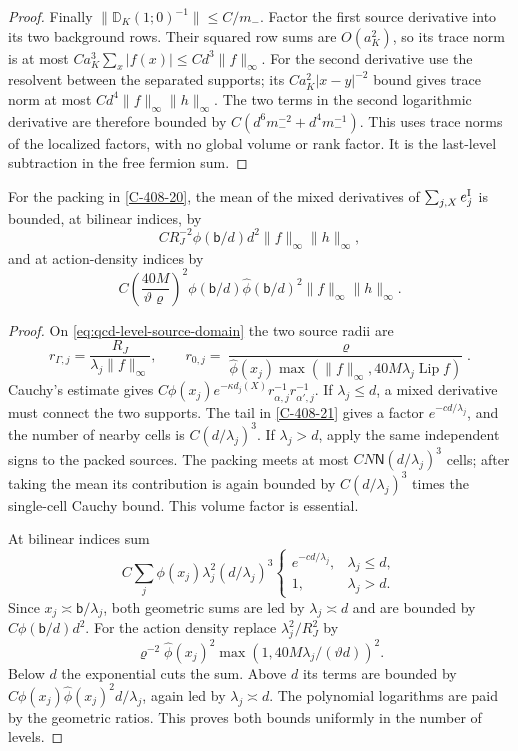 \documentclass[11pt,letterpaper,reqno]{amsart}
\makeatletter
\theoremstyle{definition}
\newcommand{\ms@minorstart}{%
  \pushQED{\qed}\renewcommand{\qedsymbol}{$\blacksquare$}}
\newenvironment{lemma}[1][]{\ms@minorstart\ms@lemma[#1]}
  {\popQED\endms@lemma}
\theoremstyle{remark}
\makeatother
\begin{document}
\begin{proof}
Finally $\|\mathbb D_K(1;0)^{-1}\|\le C/m_-$.
Factor the first source derivative into its two background rows.
Their squared row sums are $O(a_K^2)$, so its trace norm is
at most $Ca_K^3\sum_x|f(x)|\le Cd^3\|f\|_\infty$.
For the second derivative use the resolvent between the separated
supports; its $C a_K^2|x-y|^{-2}$ bound gives trace norm at most
$Cd^4\|f\|_\infty\|h\|_\infty$.
The two terms in the second logarithmic derivative are therefore
bounded by $C(d^6m_-^{-2}+d^4m_-^{-1})$.
This uses trace norms of the localized factors, with no global
volume or rank factor. It is the last-level subtraction in the
free fermion sum.
\end{proof}

\begin{lemma}[The interaction error]\label{C-408-26}
For the packing in \cref{C-408-20}, the mean of the mixed derivatives
of $\sum_{j,X}e_j^{\rm I}$ is bounded, at bilinear indices, by
\[
 C R_J^{-2}\phi(\mathsf b/d)d^2\|f\|_\infty\|h\|_\infty,
\]
and at action-density indices by
\[
 C\left(\frac{40M}{\vartheta\varrho}\right)^2
 \phi(\mathsf b/d)\widehat\phi(\mathsf b/d)^2
                       \|f\|_\infty\|h\|_\infty.
\]
\end{lemma}

\begin{proof}
On \eqref{eq:qcd-level-source-domain} the two source radii are
\[
 r_{\Gamma,j}=\frac{R_J}{\lambda_j\|f\|_\infty},\qquad
 r_{0,j}=\frac{\varrho}{\widehat\phi(x_j)
                  \max(\|f\|_\infty,40M\lambda_j\operatorname{Lip}f)}.
\]
Cauchy's estimate gives
$C\phi(x_j)e^{-\kappa d_j(X)}r_{\alpha,j}^{-1}r_{\alpha',j}^{-1}$.
If $\lambda_j\le d$, a mixed derivative must connect the two
supports. The tail in \cref{C-408-21} gives a factor
$e^{-c d/\lambda_j}$, and the number of nearby cells is
$C(d/\lambda_j)^3$.
If $\lambda_j>d$, apply the same independent signs to the packed
sources. The packing meets at most
$C N\mathsf N(d/\lambda_j)^3$ cells; after taking the mean its
contribution is again bounded by $C(d/\lambda_j)^3$ times the
single-cell Cauchy bound. This volume factor is essential.

At bilinear indices sum
\[
 C\sum_j\phi(x_j)\lambda_j^2(d/\lambda_j)^3
 \begin{cases}e^{-cd/\lambda_j},&\lambda_j\le d,\\1,&\lambda_j>d.
 \end{cases}
\]
Since $x_j\asymp\mathsf b/\lambda_j$, both geometric sums are
led by $\lambda_j\asymp d$ and are bounded by
$C\phi(\mathsf b/d)d^2$.
For the action density replace $\lambda_j^2/R_J^2$ by
\[
 \varrho^{-2}\widehat\phi(x_j)^2
                    \max(1,40M\lambda_j/(\vartheta d))^2.
\]
Below $d$ the exponential cuts the sum. Above $d$ its terms
are bounded by $C\phi(x_j)\widehat\phi(x_j)^2d/\lambda_j$,
again led by $\lambda_j\asymp d$. The polynomial logarithms
are paid by the geometric ratios. This proves both bounds
uniformly in the number of levels.
\end{proof}
\end{document}
